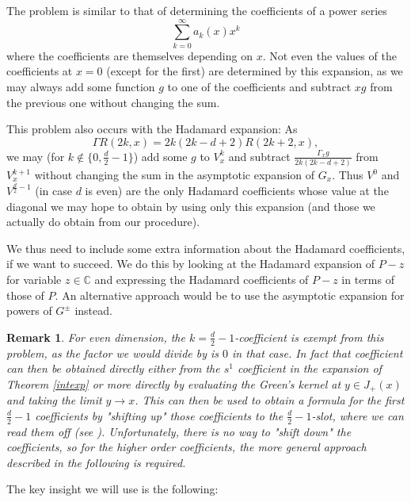 \documentclass[11pt]{article}
\def\C{{\mathbb{C}}}
\def\insum#1{\sum\limits_{#1=0}^\infty}
\newtheorem{rem}[df]{Remark}
\begin{document}
The problem is similar to that of determining the coefficients of a power series 
\[\insum{k}a_k(x)x^k\]
where the coefficients are themselves depending on $x$. Not even the values of the coefficients at $x=0$ (except for the first) are determined by this expansion, as we may always add some function $g$ to one of the coefficients and subtract $xg$ from the previous one without changing the sum.

This problem also occurs with the Hadamard expansion: As
\[\Gamma R(2k,x)=2k(2k-d+2)R(2k+2,x),\]
we may (for $k\notin \{0, \frac{d}{2}-1\}$) add some $g$ to $V^{k}_x$ and subtract $\frac{\Gamma_x g}{2k(2k-d+2)}$ from $V^{k+1}_x$ without changing the sum in the asymptotic expansion of $G_x$. Thus $V^{0}$ and $V^{\frac{d}{2}-1}$ (in case $d$ is even) are the only Hadamard coefficients whose value at the diagonal we may hope to obtain by using only this expansion (and those we actually do obtain from our procedure).

We thus need to include some extra information about the Hadamard coefficients, if we want to succeed. We do this  by looking at the Hadamard expansion of $P-z$ for variable $z\in \C$ and expressing the Hadamard coefficients of $P-z$ in terms of those of $P$. An alternative approach would be to use the asymptotic expansion for powers of $G^\pm$ instead. 
\begin{rem}
	For even dimension, the $k=\tfrac{d}{2}-1$-coefficient is exempt from this problem, as the factor we would divide by is $0$ in that case. In fact that coefficient can then be obtained directly either from the $s^1$ coefficient in the expansion of Theorem \ref{intexp} or more directly by evaluating the Green's kernel at $y\in J_+(x)$ and taking the limit $y\rightarrow x$. This can then be used to obtain a formula for the first $\tfrac{d}{2}-1$ coefficients by "shifting up" those coefficients to the $\tfrac{d}{2}-1$-slot, where we can read them off (see \cite[Section 5.1]{Ron}). Unfortunately, there is no way to "shift down" the coefficients, so for the higher order coefficients, the more general approach described in the following is required.
\end{rem}
The key insight we will use is the following:
\end{document}
